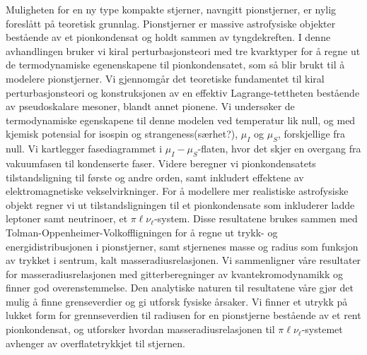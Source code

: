Muligheten for en ny type kompakte stjerner, navngitt pionstjerner, er nylig foreslått på teoretisk grunnlag.
Pionstjerner er massive astrofysiske objekter bestående av et pionkondensat og holdt sammen av tyngdekreften.
I denne avhandlingen bruker vi kiral perturbasjonsteori med tre kvarktyper for å regne ut de termodynamiske egenenskapene til pionkondensatet, som så blir brukt til å modelere pionstjerner.
Vi gjennomgår det teoretiske fundamentet til kiral perturbasjonsteori og konstruksjonen av en effektiv Lagrange-tettheten bestående av pseudoskalare mesoner, blandt annet pionene.
Vi undersøker de termodynamiske egenskapene til denne modelen ved temperatur lik null, og med kjemisk potensial for isospin og strangeness(særhet?), $\mu_I$ og $\mu_S$, forskjellige fra null.
Vi kartlegger fasediagrammet i $\mu_I-\mu_S$-flaten, hvor det skjer en overgang fra vakuumfasen til kondenserte faser.
Videre beregner vi pionkondensatets tilstandsligning til første og andre orden, samt inkludert effektene av elektromagnetiske vekselvirkninger.
For å modellere mer realistiske astrofysiske objekt regner vi ut tilstandsligningen til et pionkondensate som inkluderer ladde leptoner samt neutrinoer, et $\pi\ell\nu_\ell$-system.
Disse resultatene brukes sammen med Tolman-Oppenheimer-Volkoffligningen for å regne ut trykk- og energidistribusjonen i pionstjerner, samt stjernenes masse og radius som funksjon av trykket i sentrum, kalt masseradiusrelasjonen.
Vi sammenligner våre resultater for masseradiusrelasjonen med gitterberegninger av kvantekromodynamikk og finner god overenstemmelse.
Den analytiske naturen til resultatene våre gjør det mulig å finne grenseverdier og gi utforsk fysiske årsaker.
Vi finner et utrykk på lukket form for grennseverdien til radiusen for en pionstjerne bestående av et rent pionkondensat, og utforsker hvordan masseradiusrelasjonen til $\pi\ell\nu_\ell$-systemet avhenger av overflatetrykkjet til stjernen.
